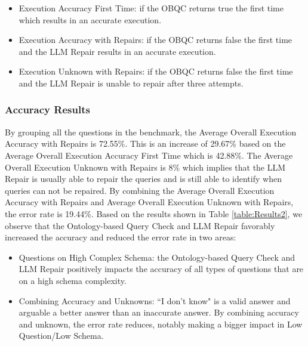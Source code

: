 \documentclass[11pt]{article}
\begin{document}
\begin{itemize}
    \item Execution Accuracy First Time: if the OBQC returns true the first time which results in an accurate execution.
    \item Execution Accuracy with Repairs: if the OBQC returns false the first time and the LLM Repair results in an accurate execution. 
    \item Execution Unknown with Repairs: if the OBQC returns false the first time and the LLM Repair is unable to repair after three attempts. 
\end{itemize}

\subsubsection{Accuracy Results}

By grouping all the questions in the benchmark, the Average Overall Execution Accuracy with Repairs is 72.55\%. 
This is an increase of 29.67\% based on the Average Overall Execution Accuracy First Time which is 42.88\%.
The Average Overall Execution Unknown with Repairs is 8\% which implies that the LLM Repair is usually able to repair the queries and is still able to identify when queries can not be repaired.
By combining the Average Overall Execution Accuracy with Repairs and Average Overall Execution Unknown with Repairs, the error rate is 19.44\%. 
Based on the results shown in Table \ref{table:Results2}, we observe that the Ontology-based Query Check and LLM Repair favorably increased the accuracy and reduced the error rate in two areas: 
\begin{itemize}
    \item Questions on High Complex Schema: the Ontology-based Query Check and LLM Repair positively impacts the accuracy of all types of questions that are on a high schema complexity.
    \item Combining Accuracy and Unknowns: ``I don't know" is a valid answer and arguable a better answer than an inaccurate answer. By combining accuracy and unknown, the error rate reduces, notably making a bigger impact in Low Question/Low Schema.

\end{itemize}
\end{document}
